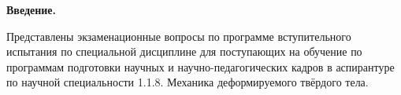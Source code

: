\documentclass[main.tex]{subfiles}
\begin{document}
\textbf{Введение.}

\begin{nohyphen}
Представлены экзаменационные вопросы по программе вступительного испытания по специальной дисциплине для поступающих на обучение по программам подготовки научных и научно-педагогических кадров в аспирантуре по научной специальности 1.1.8. Механика деформируемого твёрдого тела.
\end{nohyphen}
\vspace*{7mm}
\end{document}
